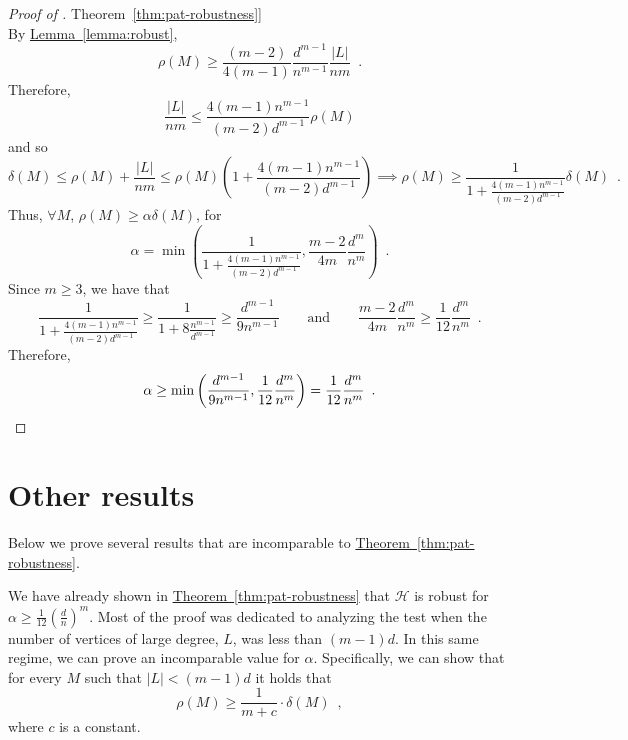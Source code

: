 \documentclass[11pt]{article}
\numberwithin{equation}{section}
\theoremstyle{definition}
\theoremstyle{plain}
\newcommand{\expref}[2]{\hyperref[#2]{#1~\ref{#2}}}
\theoremstyle{plain}
\newcommand{\colored}{}
\newcommand{\reldist}{\colored{\delta}}
\newcommand{\robust}{\colored{\rho}} %
\newcommand{\tester}{\colored{\mathcal H}} %
\newcommand{\codedist}{\colored{d}} %
\newcommand{\blocklength}{\colored{n}} %
\newcommand{\testerinput}{\colored{M}} %
\newcommand\abs[1]{\colored{\left|#1\right|}}
\begin{document}
\begin{proof}[Proof of \expref{Theorem}{thm:pat-robustness}]
\begin{equation*}
\end{equation*}
By \expref{Lemma}{lemma:robust},
\[
  \robust(\testerinput) \geq \frac{(m-2)}{4 (m-1)} \frac{\codedist^{m-1}}{\blocklength^{m-1}} \frac{\abs{L}}{\blocklength m}\enspace.
\]
Therefore,
\[
  \frac{\abs{L}}{\blocklength m} \leq \frac{4(m-1)\blocklength^{m-1}}{(m-2)\codedist^{m-1}} \robust(\testerinput)
\]
and so
\begin{equation*}
\reldist(\testerinput) \leq \robust(\testerinput) + \frac{\abs{L}}{\blocklength m} \leq \robust(\testerinput) \left(1 +  \frac{4(m-1)\blocklength^{m-1}}{(m-2)\codedist^{m-1}}  \right) \implies \robust(\testerinput) \geq \frac{1}{1 +  \frac{4(m-1)\blocklength^{m-1}}{(m-2)\codedist^{m-1}}} \reldist(\testerinput) \enspace.
\end{equation*}
Thus, $\forall \testerinput$, $\robust(\testerinput) \geq \alpha \reldist(\testerinput)$, for
\[
  \alpha = \min \left (\frac{1}{1 +  \frac{4(m-1)\blocklength^{m-1}}{(m-2)\codedist^{m-1}}}, \frac{m-2}{4m} \frac{\codedist^m}{\blocklength^m}\right)\enspace.
\]
Since $m \geq 3$, we have that
\[
  \frac{1}{1 +  \frac{4(m-1)\blocklength^{m-1}}{(m-2)\codedist^{m-1}}} \geq \frac{1}{1 + 8\frac{\blocklength^{m-1}}{\codedist^{m-1}} } \geq \frac{\codedist^{m-1}}{9\blocklength^{m-1}}
\qquad
\text{and}
\qquad
  \frac{m-2}{4m} \frac{\codedist^m}{\blocklength^m}  \geq \frac{1}{12} \frac{\codedist^m}{\blocklength^m}\enspace.
\]
Therefore,
\[
  \alpha \geq \min\left(\frac{\codedist^{m-1}}{9\blocklength^{m-1}}, \frac{1}{12} \frac{\codedist^m}{\blocklength^m}\right) = \frac{1}{12} \frac{\codedist^m}{\blocklength^m}\enspace.\qedhere
  \]
  \end{proof}






%
%


%
%
%
%
%
%

%
%
%
\section{Other results}
\label{sec:other}

%
Below we prove several results that are incomparable to \expref{Theorem}{thm:pat-robustness}.       %

We have already shown in \expref{Theorem}{thm:pat-robustness} that $\tester$ is robust for $\alpha \geq \frac{1}{12} \left(\frac{\codedist}{\blocklength}\right)^m$. Most of the proof was dedicated to analyzing the test when the
%
number of  %
%
%
vertices of large degree, %
$L$, was less than $(m-1)\codedist$. In this same regime, we can prove an incomparable value for $\alpha$. Specifically, we can show that for every $\testerinput$ such that $\abs{L} < (m-1) \codedist$ it holds that
\[
  \robust(\testerinput) \geq \frac{1}{m + c} \cdot \reldist(\testerinput)\enspace,
\]
where $c$ is a constant.
\end{document}
